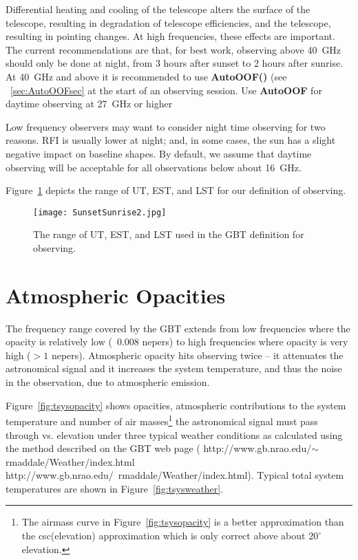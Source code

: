 Differential heating and cooling of the telescope alters the surface of the 
telescope, resulting in degradation of telescope efficiencies, and 
the telescope, resulting in pointing changes.  At high frequencies, these 
effects are important.  The current recommendations are that, for best work, 
observing above 40~GHz should only be done at night, from 3 hours after 
sunset to 2 hours after sunrise.  At 40~GHz and above it is recommended to
use {\bfseries{\textcolor{pythonKeywords}{AutoOOF}}()} (see ~\ref{sec:AutoOOFsec}
at the start of an observing session. Use
{\bfseries{\textcolor{pythonKeywords}{AutoOOF}}} for daytime observing at
27~GHz or higher 

Low frequency observers may want to consider night time observing for two 
reasons.  \gls{RFI} is usually lower at night; and, in some cases, the sun has a 
slight negative impact on \gls{baseline} shapes.  By default, we assume that 
daytime observing will be acceptable for all observations below about 16~GHz.

Figure~\ref{fig:nighttime} depicts the range of UT, EST, and LST for our 
definition of  observing. 

\begin{figure}[!h]
\begin{center}
\texttt{[image: SunsetSunrise2.jpg]}
\caption[Night-time for the GBT]
{The range of UT, EST, and LST used in the \gls{GBT} definition for
 observing.\label{fig:nighttime}}
\end{center}
\end{figure}

\newpage

\section{Atmospheric Opacities}

The frequency range covered by the \gls{GBT} extends from low frequencies where 
the opacity is relatively low (~0.008 nepers) to high frequencies where opacity
is very high ($> 1$ nepers).   Atmospheric opacity hits observing twice -- it
attenuates the astronomical signal and it increases the system temperature, and
thus the noise in the observation, due to atmospheric emission.  

Figure~\ref{fig:tsysopacity} shows opacities, atmospheric contributions to the
system temperature and number of air masses\footnote{The airmass curve in 
Figure~\ref{fig:tsysopacity} is a better approximation than the csc(elevation)
approximation which is only correct above about $20^\circ$ elevation.} the
astronomical signal must pass through vs. elevation  under three typical weather
conditions as calculated using the method described on the \gls{GBT}
 web page (\htmladdnormallink
{http://www.gb.nrao.edu/$\sim$rmaddale/Weather/index.html}
{http://www.gb.nrao.edu/~rmaddale/Weather/index.html}). Typical total system
temperatures are shown in Figure~\ref{fig:tsysweather}.

